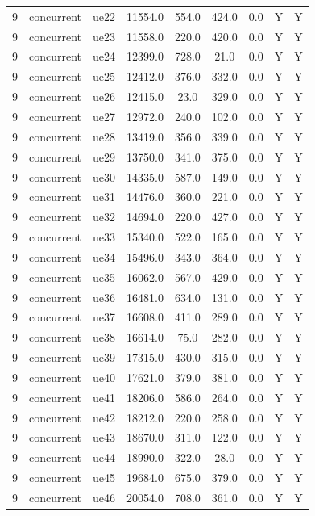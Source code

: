 \begin{table}[ht]
\begin{tabular}{|c|c|c|c|c|c|c|c|c|}
9 & concurrent & ue22 & 11554.0 & 554.0 & 424.0 & 0.0 & Y & Y \\
9 & concurrent & ue23 & 11558.0 & 220.0 & 420.0 & 0.0 & Y & Y \\
9 & concurrent & ue24 & 12399.0 & 728.0 & 21.0 & 0.0 & Y & Y \\
9 & concurrent & ue25 & 12412.0 & 376.0 & 332.0 & 0.0 & Y & Y \\
9 & concurrent & ue26 & 12415.0 & 23.0 & 329.0 & 0.0 & Y & Y \\
9 & concurrent & ue27 & 12972.0 & 240.0 & 102.0 & 0.0 & Y & Y \\
9 & concurrent & ue28 & 13419.0 & 356.0 & 339.0 & 0.0 & Y & Y \\
9 & concurrent & ue29 & 13750.0 & 341.0 & 375.0 & 0.0 & Y & Y \\
9 & concurrent & ue30 & 14335.0 & 587.0 & 149.0 & 0.0 & Y & Y \\
9 & concurrent & ue31 & 14476.0 & 360.0 & 221.0 & 0.0 & Y & Y \\
9 & concurrent & ue32 & 14694.0 & 220.0 & 427.0 & 0.0 & Y & Y \\
9 & concurrent & ue33 & 15340.0 & 522.0 & 165.0 & 0.0 & Y & Y \\
9 & concurrent & ue34 & 15496.0 & 343.0 & 364.0 & 0.0 & Y & Y \\
9 & concurrent & ue35 & 16062.0 & 567.0 & 429.0 & 0.0 & Y & Y \\
9 & concurrent & ue36 & 16481.0 & 634.0 & 131.0 & 0.0 & Y & Y \\
9 & concurrent & ue37 & 16608.0 & 411.0 & 289.0 & 0.0 & Y & Y \\
9 & concurrent & ue38 & 16614.0 & 75.0 & 282.0 & 0.0 & Y & Y \\
9 & concurrent & ue39 & 17315.0 & 430.0 & 315.0 & 0.0 & Y & Y \\
9 & concurrent & ue40 & 17621.0 & 379.0 & 381.0 & 0.0 & Y & Y \\
9 & concurrent & ue41 & 18206.0 & 586.0 & 264.0 & 0.0 & Y & Y \\
9 & concurrent & ue42 & 18212.0 & 220.0 & 258.0 & 0.0 & Y & Y \\
9 & concurrent & ue43 & 18670.0 & 311.0 & 122.0 & 0.0 & Y & Y \\
9 & concurrent & ue44 & 18990.0 & 322.0 & 28.0 & 0.0 & Y & Y \\
9 & concurrent & ue45 & 19684.0 & 675.0 & 379.0 & 0.0 & Y & Y \\
9 & concurrent & ue46 & 20054.0 & 708.0 & 361.0 & 0.0 & Y & Y \\

\end{tabular}
\end{table}
